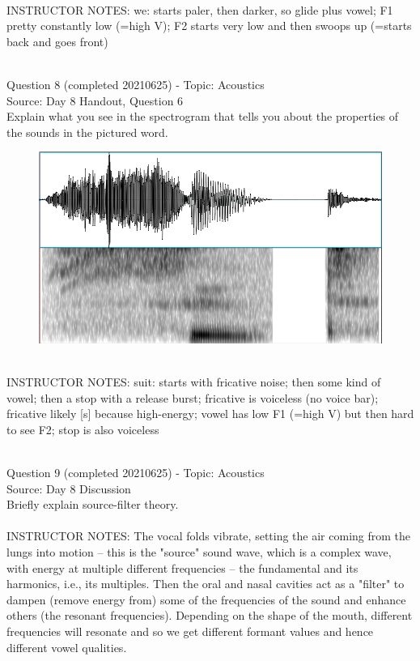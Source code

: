\documentclass[12pt]{article}
\begin{document}
~\\
INSTRUCTOR NOTES: we: starts paler, then darker, so glide plus vowel; F1 pretty constantly low (=high V); F2 starts very low and then swoops up (=starts back and goes front)


~\\

{\large Question 8} (completed 20210625) - Topic: Acoustics\\
Source: Day 8 Handout, Question 6\\

Explain what you see in the spectrogram that tells you about the properties of the sounds in the pictured word.\\

\begin{figure}[H]
\includegraphics{../images/spectrogram_suit.png}
\end{figure}

~\\
INSTRUCTOR NOTES: suit: starts with fricative noise; then some kind of vowel; then a stop with a release burst; fricative is voiceless (no voice bar); fricative likely [s] because high-energy; vowel has low F1 (=high V) but then hard to see F2; stop is also voiceless


~\\

{\large Question 9} (completed 20210625) - Topic: Acoustics\\
Source: Day 8 Discussion\\

Briefly explain source-filter theory.\\


~\\
INSTRUCTOR NOTES: The vocal folds vibrate, setting the air coming from the lungs into motion -- this is the "source" sound wave, which is a complex wave, with energy at multiple different frequencies – the fundamental and its harmonics, i.e., its multiples. Then the oral and nasal cavities act as a "filter" to dampen (remove energy from) some of the frequencies of the sound and enhance others (the resonant frequencies). Depending on the shape of the mouth, different frequencies will resonate and so we get different formant values and hence different vowel qualities.
\end{document}
